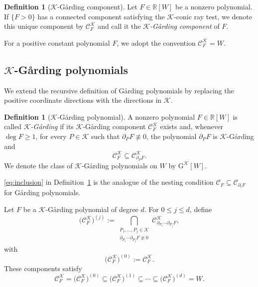 \documentclass[oneside,english,letterpaper]{amsart}
\numberwithin{equation}{section}
\theoremstyle{plain}
\theoremstyle{definition}
\newtheorem{defn}[thm]{Definition}
\theoremstyle{remark}
\def\pdv{\partial}
\begin{document}
\begin{defn}[\(\mathcal K\)-G{\aa}rding component]
\label{def:K-Garding-component}
Let \(F\in\mathbb{R}[W]\) be a nonzero polynomial. If \(\{F>0\}\)
has a connected component satisfying the \(\mathcal K\)-conic ray
test, we denote this unique component by
\(\mathcal C_F^{\mathcal K}\) and call it the
\emph{\(\mathcal K\)-G{\aa}rding component} of \(F\).
\end{defn}
For a positive constant polynomial \(F\), we adopt the convention
\(
\mathcal C_F^{\mathcal K}=W.
\)
\subsection{\(\mathcal K\)-G{\aa}rding polynomials}
We extend the recursive definition of G{\aa}rding polynomials
by replacing the positive coordinate directions with the directions
in \(\mathcal K\).
\begin{defn}[\(\mathcal K\)-G{\aa}rding polynomial]
\label{def:K-Garding}
A nonzero polynomial \(F\in\mathbb{R}[W]\) is called
\emph{\(\mathcal K\)-G{\aa}rding} if its
\(\mathcal K\)-G{\aa}rding component
\(\mathcal C_F^{\mathcal K}\) exists and, whenever
\(\deg F\geq 1\), for every \(P\in\mathcal K\) such that
\(\pdv_P F\not\equiv 0\), the polynomial \(\pdv_P F\) is
\(\mathcal K\)-G{\aa}rding and
\begin{equation}\label{eq:inclusion}
\mathcal C_F^{\mathcal K}
\subseteq
\mathcal C_{\pdv_P F}^{\mathcal K}.
\end{equation}
We denote the class of \(\mathcal K\)-G{\aa}rding polynomials on
\(W\) by
\(
\mathrm{G}^{\mathcal K}[W].
\)
\end{defn}
\eqref{eq:inclusion} in Definition~\ref{def:K-Garding} is the
analogue of the nesting condition
\(
\mathcal C_F\subseteq\mathcal C_{\partial_i F}
\)
for  G{\aa}rding polynomials.

Let \(F\) be a \(\mathcal K\)-G{\aa}rding polynomial of degree \(d\).
For \(0\leq j\leq d\), define
\[
\bigl(\mathcal C_F^{\mathcal K}\bigr)^{(j)}
:=
\bigcap_{\substack{
P_1,\ldots,P_j\in\mathcal K\\
\pdv_{P_1}\cdots\pdv_{P_j}F\not\equiv 0
}}
\mathcal C_{\pdv_{P_1}\cdots\pdv_{P_j}F}^{\mathcal K},
\]
with
\[
\bigl(\mathcal C_F^{\mathcal K}\bigr)^{(0)}
:=
\mathcal C_F^{\mathcal K}.
\]
These components satisfy
\[
\mathcal C_F^{\mathcal K}
=
\bigl(\mathcal C_F^{\mathcal K}\bigr)^{(0)}
\subseteq
\bigl(\mathcal C_F^{\mathcal K}\bigr)^{(1)}
\subseteq
\cdots
\subseteq
\bigl(\mathcal C_F^{\mathcal K}\bigr)^{(d)}
=
W.
\]
\end{document}
